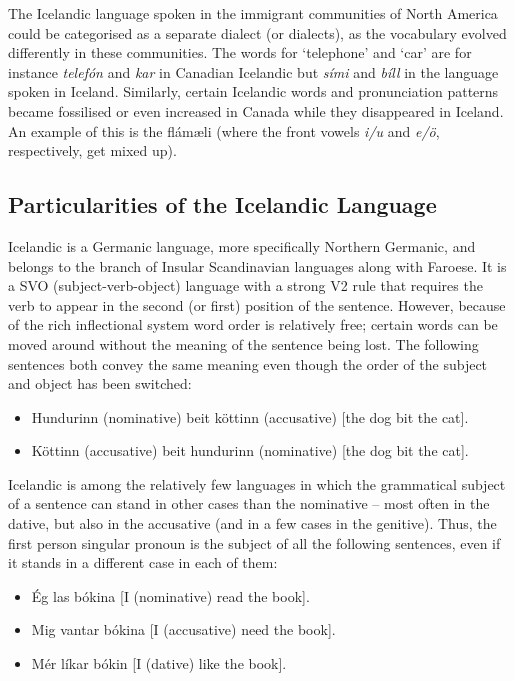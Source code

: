 \begin{multicols}{2}
The Icelandic language spoken in the immigrant communities of North America could be categorised as a separate dialect (or dialects), as the vocabulary evolved differently in these communities. The words for ‘telephone’ and ‘car’ are for instance \textit{telefón} and \textit{kar} in Canadian Icelandic but \textit{sími} and \textit{bíll} in the language spoken in Iceland. Similarly, certain Icelandic words and pronunciation patterns became fossilised or even increased in Canada while they disappeared in Iceland. An example of this is the flámæli (where the front vowels \textit{i/u} and \textit{e/ö}, respectively, get mixed up).

\subsection{Particularities of the Icelandic Language}

Icelandic is a Germanic language, more specifically Northern Germanic, and belongs to the branch of Insular Scandinavian languages along with Faroese. It is a SVO (subject-verb-object) language with a strong V2 rule that requires the verb to appear in the second (or first) position of the sentence. However, because of the rich inflectional system word order is relatively free; certain words can be moved around without the meaning of the sentence being lost. The following sentences both convey the same meaning even though the order of the subject and object has been switched:

\begin{itemize}
\item Hundurinn (nominative) beit köttinn (accusative) {[}the dog bit the cat{]}.
\item Köttinn (accusative) beit hundurinn (nominative) {[}the dog bit the cat{]}.
\end{itemize}

Icelandic is among the relatively few languages in which the grammatical subject of a sentence can stand in other cases than the nominative -- most often in the dative, but also in the accusative (and in a few cases in the genitive). Thus, the first person singular pronoun is the subject of all the following sentences, even if it stands in a different case in each of them:

\begin{itemize}
\item Ég las bókina {[}I (nominative) read the book{]}.
\item Mig vantar bókina {[I (accusative) need the book]}.
\item Mér líkar bókin {[I (dative) like the book]}.
\end{itemize}


\end{multicols}
